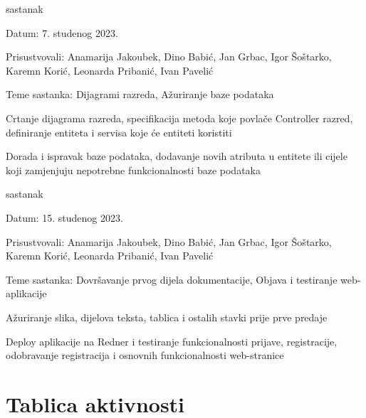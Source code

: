\begin{packed_enum}
			\item  sastanak
			\item[] \begin{packed_item}
				\item Datum: 7. studenog 2023.
				\item Prisustvovali: Anamarija Jakoubek, Dino Babić, Jan Grbac, Igor Šoštarko, Karemn Korić, Leonarda Pribanić, Ivan Pavelić
				\item Teme sastanka: Dijagrami razreda, Ažuriranje baze podataka
				\begin{packed_item}
					\item Crtanje dijagrama razreda, specifikacija metoda koje povlače Controller razred, definiranje entiteta i servisa koje će entiteti koristiti
					\item Dorada i ispravak baze podataka, dodavanje novih atributa u entitete ili cijele koji zamjenjuju nepotrebne funkcionalnosti baze podataka 
				\end{packed_item}
			\end{packed_item}
			
			\item  sastanak
			\item[] \begin{packed_item}
				\item Datum: 15. studenog 2023.
				\item Prisustvovali: Anamarija Jakoubek, Dino Babić, Jan Grbac, Igor Šoštarko, Karemn Korić, Leonarda Pribanić, Ivan Pavelić
				\item Teme sastanka: Dovršavanje prvog dijela dokumentacije, Objava i testiranje web-aplikacije
				\begin{packed_item}
					\item Ažuriranje slika, dijelova teksta, tablica i ostalih stavki prije prve predaje
					\item Deploy aplikacije na Redner i testiranje funkcionalnosti prijave, registracije, odobravanje registracija i osnovnih funkcionalnosti web-stranice
				\end{packed_item}
			\end{packed_item}
			
			
		\end{packed_enum}
		
		\eject
		\section*{Tablica aktivnosti}

